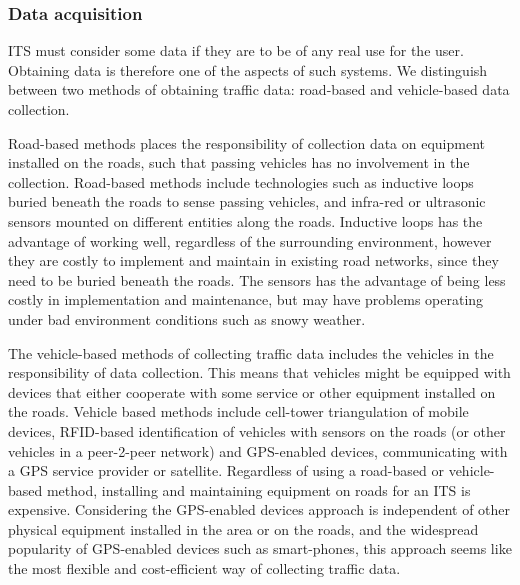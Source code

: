 \subsubsection*{Data acquisition}
ITS must consider some data if they are to be of any real use for the user. Obtaining data is therefore one of the aspects of such systems. We distinguish between two methods of obtaining traffic data: road-based and vehicle-based data collection.

Road-based methods places the responsibility of collection data on equipment installed on the roads, such that passing vehicles has no involvement in the collection. Road-based methods\cite{PIARC0} include technologies such as inductive loops buried beneath the roads to sense passing vehicles, and infra-red or ultrasonic sensors mounted on different entities along the roads. Inductive loops has the advantage of working well, regardless of the surrounding environment, however they are costly to implement and maintain in existing road networks, since they need to be buried beneath the roads. The sensors has the advantage of being less costly in implementation and maintenance, but may have problems operating under bad environment conditions such as snowy weather\cite{KamranHaas2007,PIARC0}.

The vehicle-based methods of collecting traffic data includes the vehicles in the responsibility of data collection. This means that vehicles might be equipped with devices that either cooperate with some service or other equipment installed on the roads. Vehicle based methods include cell-tower triangulation of mobile devices, RFID-based identification of vehicles with sensors on the roads (or other vehicles in a peer-2-peer network) and GPS-enabled devices, communicating with a GPS service provider or satellite. Regardless of using a road-based or vehicle-based method, installing and maintaining equipment on roads for an ITS is expensive\cite{KamranHaas2007}. Considering the GPS-enabled devices approach is independent of other physical equipment installed in the area or on the roads, and the widespread popularity of GPS-enabled devices such as smart-phones, this approach seems like the most flexible and cost-efficient way of collecting traffic data.

